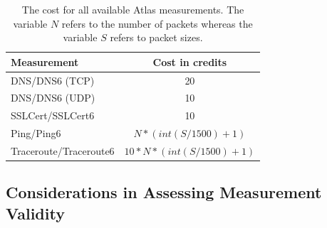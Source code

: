 %
%
%

% 

\begin{table}[t]
\centering
\begin{tabular}{lc}
\textbf{Measurement} & \textbf{Cost in credits} \\
\hline 
DNS\slash DNS6 (TCP) & 20\\ 
DNS\slash DNS6 (UDP) & 10\\ 
SSLCert\slash SSLCert6 & 10 \\
Ping\slash Ping6 & $N * (int(S/1500)+1)$\\
Traceroute\slash Traceroute6 & $ 10*N*(int(S/1500)+1)$\\[1ex] 
\hline 
\end{tabular} 
\caption{The cost for all available Atlas measurements.  The variable $N$
refers to the number of packets whereas the variable $S$ refers to packet
sizes.}
\label{tab:cost} 
\end{table}

\subsection{Considerations in Assessing Measurement Validity}

